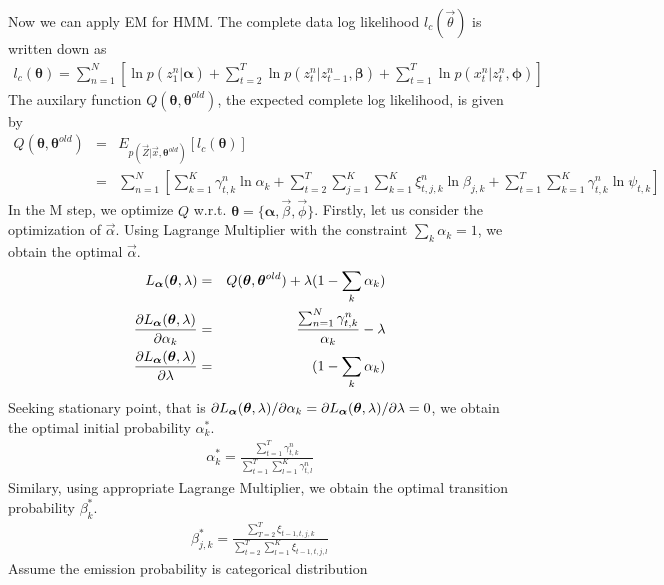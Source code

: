 Now we can apply EM for HMM.
The complete data log likelihood $l_c(\vec{\theta})$ is written down as 
\begin{eqnarray}
l_c(\mathbf{\theta}) = \sum_{n=1}^N \left[ \ln p(z^n_1| \mathbf{\alpha}) 
+ \sum_{t=2}^T\ln p(z^n_t| z^n_{t-1}, \mathbf{\beta})
+ \sum_{t=1}^T\ln p(x^n_t | z^n_{t}, \mathbf{\phi})
\right]
\end{eqnarray}
The auxilary function $Q(\mathbf{\theta}, \mathbf{\theta}^{old})$, the expected complete log likelihood, is given by
\begin{eqnarray}
Q(\mathbf{\theta}, \mathbf{\theta}^{old}) &=& E_{p(\vec{Z}|\vec{x}, \mathbf{\theta}^{old})}[l_c(\mathbf{\theta})] \nonumber \\
&=& \sum_{n=1}^N \left[ \sum_{k=1}^K \gamma^n_{t,k} \ln \alpha_k 
+ \sum_{t=2}^T \sum_{j=1}^K \sum_{k=1}^K \xi^n_{t,j,k}\ln \beta_{j,k}
    + \sum_{t=1}^T \sum_{k=1}^K \gamma^n_{t, k}\ln \psi_{t,k}
\right]
\end{eqnarray}
In the M step, we optimize $Q$ w.r.t. $\mathbf{\theta} = \{ \mathbf{\alpha}, \vec{\beta}, \vec{\phi}\}$. Firstly, let us consider the optimization of $\vec{\alpha}$. Using Lagrange Multiplier with the constraint $\sum_k \alpha_k = 1$, we obtain the optimal $\vec{\alpha}$. 
\begin{eqnarray}
  L_{\vec{\alpha}}(\vec{\theta}, \lambda)
 &=& Q(\mathbf{\theta}, \mathbf{\theta}^{old}) + \lambda (1 - \sum_k \alpha_k) \\ 
  \pard{L_{\vec{\alpha}}(\vec{\theta}, \lambda)}{\alpha_k} &=& \frac{\sum_{n=1}^N \gamma^n_{t,k}}{\alpha_k} - \lambda \\
  \pard{L_{\vec{\alpha}}(\vec{\theta}, \lambda)}{\lambda} &=& (1 - \sum_k \alpha_k) 
\end{eqnarray}
Seeking stationary point, that is $ \pardi{L_{\vec{\alpha}}(\vec{\theta}, \lambda)}{\alpha_k} = \pardi{L_{\vec{\alpha}}(\vec{\theta}, \lambda)}{\lambda} = 0$, we obtain the optimal initial probability $\alpha^*_k$.
\begin{eqnarray}
\alpha^*_k = \frac{\sum_{t=1}^T \gamma^n_{t, k}}{\sum_{t=1}^T \sum_{l=1}^{K}\gamma^n_{t, l}}
\end{eqnarray}
Similary, using appropriate Lagrange Multiplier, we obtain the optimal transition probability $\beta^*_k$.
\begin{eqnarray}
\beta^*_{j,k} = \frac{\sum_{T=2}^T \xi_{t-1, t, j, k}}{\sum_{t=2}^T \sum_{l=1}^{K}\xi_{t-1, t, j, l}}
\end{eqnarray}
Assume the emission probability is categorical distribution
